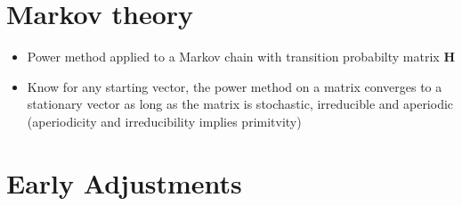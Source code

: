 \documentclass[11pt]{report}
\begin{document}
\section{Markov theory}
\begin{itemize}
\item Power method applied to a Markov chain with transition probabilty matrix \textbf{H}
\item Know for any starting vector, the power method on a matrix converges to a stationary vector as long as the matrix is stochastic, irreducible and aperiodic (aperiodicity and irreducibility implies primitvity)
\end{itemize}
\section{Early Adjustments}
\end{document}
